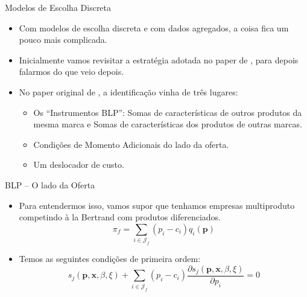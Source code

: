 \documentclass{beamer}
\begin{document}
\begin{frame}{Modelos de Escolha Discreta}
\begin{itemize}
    \item Com modelos de escolha discreta e com dados agregados, a coisa fica um pouco mais complicada.
    \item Inicialmente vamos revisitar a estratégia adotada no paper de \citet{Berry1995}, para depois falarmos do que veio depois.
    \item No paper original de \citet{Berry1995}, a identificação vinha de três lugares:
    \begin{itemize}
        \item Os ``Instrumentos BLP'': Somas de características de outros produtos da mesma marca e Somas de características dos produtos de outras marcas.
        \item Condições de Momento Adicionais do lado da oferta.
        \item Um deslocador de custo.
        
    \end{itemize}
\end{itemize}
    
\end{frame}

\begin{frame}{BLP -- O lado da Oferta}
\begin{itemize}
    \item Para entendermos isso, vamos supor que tenhamos empresas multiproduto competindo à la Bertrand com produtos diferenciados.
    \[
    \pi_{f}=\sum_{i \in \mathcal{J}_{f}}(p_{i}-c_{i})q_{i}(\mathbf{p})
    \]
    \item Temos as seguintes condições de primeira ordem:
    \[
    s_{j}(\mathbf{p},\mathbf{x},\beta,\xi)+\sum_{i \in \mathcal{J}_{f}}(p_{i}-c_{i})\frac{\partial s_{j}(\mathbf{p}, \mathbf{x},\beta,\xi)}{\partial p_{i}}=0
    \]
\end{itemize}
    
\end{frame}
\end{document}
